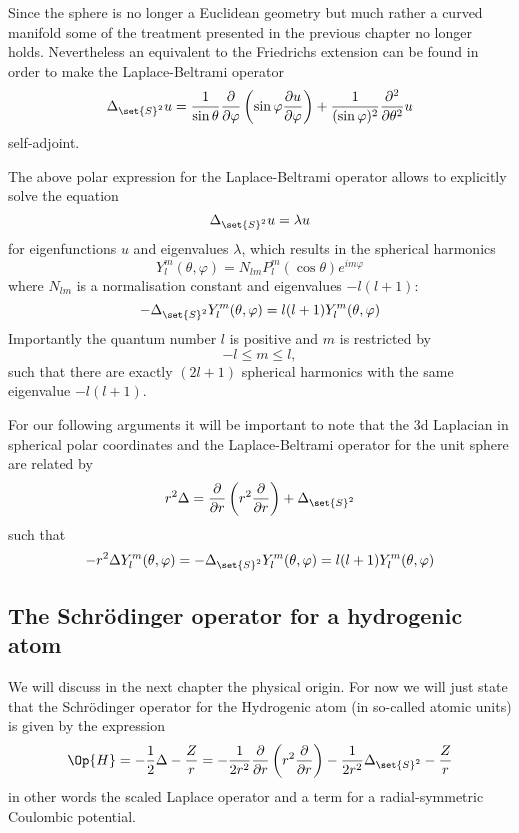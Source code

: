 Since the sphere is no longer a Euclidean geometry
but much rather a curved manifold some of the treatment presented
in the previous chapter no longer holds.
Nevertheless an equivalent to the Friedrichs extension can be found
in order to make the Laplace-Beltrami operator
\[ \Delta_{\set{S}^2} u = \frac{1}{\sin \theta} \frac{\partial}{\partial \varphi}
\left( \sin \varphi \frac{\partial u}{\partial \varphi}  \right)
+ \frac{1}{(\sin \varphi)^2} \frac{\partial^2}{\partial \theta^2} u\]
self-adjoint.

The above polar expression for the Laplace-Beltrami operator
allows to explicitly solve the equation
\newcommand{\laplaceSphere}{\Delta_{\set{S}^2}}
\[ \laplaceSphere u = \lambda u \]
for eigenfunctions $u$ and eigenvalues $\lambda$,
which results in the spherical harmonics
\[ Y_l^m(\theta, \varphi) = N_{lm} P_l^m(\cos \theta) e^{im\varphi} \]
where $N_{lm}$ is a normalisation constant
and eigenvalues $-l (l+1)$:
\begin{equation}
	-\laplaceSphere Y_l^m(\theta, \varphi) = l (l+1) Y_l^m(\theta, \varphi)
	\label{eqn:Laplace}
\end{equation}
Importantly the quantum number $l$ is positive and $m$ is restricted by
\[ -l \le m \le l, \]
such that there are exactly $(2l+1)$ spherical harmonics with the same eigenvalue
$-l (l+1)$.

For our following arguments it will be important to note
that the 3d Laplacian in spherical polar coordinates
and the Laplace-Beltrami operator for the unit sphere
are related by
\newcommand{\laplaceRadial}{\frac{\partial}{\partial r} \left( r^2 \frac{\partial}{\partial r} \right)}
\begin{equation}
r^2 \Delta = \laplaceRadial + \laplaceSphere
	\label{eqn:LaplaceCorrespondance}
\end{equation}
such that
\begin{equation}
	- r^2 \Delta Y_l^m(\theta, \varphi) = -\laplaceSphere Y_l^m(\theta, \varphi) = l (l+1) Y_l^m(\theta, \varphi)
	\label{eqn:LaplaceSphericalHarmonic}
\end{equation}


\subsection{The Schrödinger operator for a hydrogenic atom}
\label{sec:HydrogenAtom}
We will discuss in the next chapter the physical origin.
For now we will just state that the Schrödinger operator for the Hydrogenic atom
(in so-called atomic units)
is given by the expression
\begin{equation}
	\Op{H} = - \frac12 \Delta - \frac{Z}{r} = -\frac{1}{2r^2} \laplaceRadial -\frac{1}{2r^2} \laplaceSphere - \frac{Z}{r}
	\label{eqn:HydrogenOperator}
\end{equation}
in other words the scaled Laplace operator and a term for a radial-symmetric Coulombic
potential.

